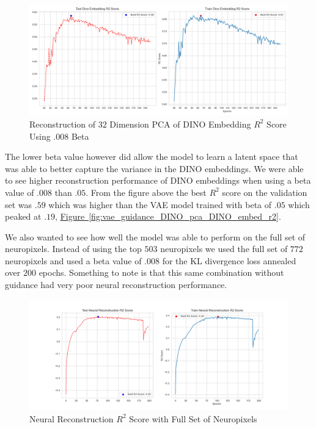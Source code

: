 \documentclass[12pt, letterpaper]{article}
\begin{document}
\begin{figure}[H]
    \centering
    \includegraphics[width=.9\textwidth]{.9_pca_DINO_embed_r2_128dim_503_top_var_200_epochs_0.008_beta_2_layer.png}
    \caption{Reconstruction of $32$ Dimension PCA of DINO Embedding $R^2$ Score Using .008 Beta}
    \label{fig:vae_guidance_DINO_pca_DINO_embed_r2_.008_beta}
\end{figure}

The lower beta value however did allow the model to learn a latent space that was able to better capture the variance in the DINO \cite{dino} embeddings. We were able to see higher reconstruction performance of DINO \cite{dino} embeddings when using a beta value of $.008$ than $.05$. From the figure above the best $R^2$ score on the validation set was $.59$ which was higher than the VAE model trained with beta of $.05$ which peaked at $.19$, \hyperref[fig:vae_guidance_DINO_pca_DINO_embed_r2]{Figure~\ref{fig:vae_guidance_DINO_pca_DINO_embed_r2}}. 

We also wanted to see how well the model was able to perform on the full set of neuropixels. Instead of using the top $503$ neuropixels we used the full set of $772$ neuropixels and used a beta value of $.008$ for the KL divergence loss annealed over $200$ epochs. Something to note is that this same combination without guidance had very poor neural reconstruction performance. 

\begin{figure}[H]
    \centering
    \includegraphics[width=1.0\textwidth]{x_r2_128dim_772_top_var_200_epochs_0.008_beta_2_layer_.9_pca_DINO_embed.png}
    \caption{Neural Reconstruction $R^2$ Score with Full Set of Neuropixels}
    \label{fig:vae_guidance_DINO_pca_full_neuropixels}
\end{figure}
\end{document}
